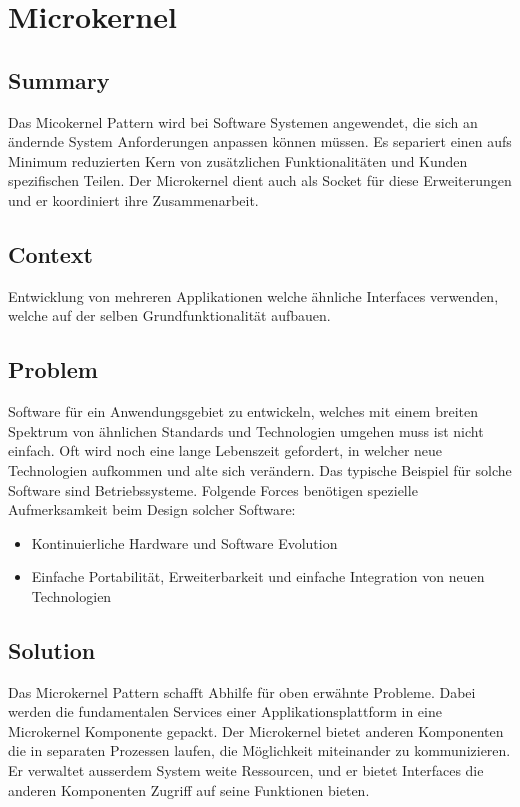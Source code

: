 \chapter{Microkernel}

\section{Summary}
Das Micokernel Pattern wird bei Software Systemen angewendet, die sich an ändernde System Anforderungen anpassen können müssen. Es separiert einen aufs Minimum reduzierten Kern von zusätzlichen Funktionalitäten und Kunden spezifischen Teilen. Der Microkernel dient auch als Socket für diese Erweiterungen und er koordiniert ihre Zusammenarbeit.
\section{Context}
Entwicklung von mehreren Applikationen welche ähnliche Interfaces verwenden, welche auf der selben Grundfunktionalität aufbauen.
\section{Problem}
Software für ein Anwendungsgebiet zu entwickeln, welches mit einem breiten Spektrum von ähnlichen Standards und Technologien umgehen muss ist nicht einfach. Oft wird noch eine lange Lebenszeit gefordert, in welcher neue Technologien aufkommen und alte sich verändern. Das typische Beispiel für solche Software sind Betriebssysteme. Folgende Forces benötigen spezielle Aufmerksamkeit beim Design solcher Software:
\begin{itemize}
	\item Kontinuierliche Hardware und Software Evolution
	\item Einfache Portabilität, Erweiterbarkeit und einfache Integration von neuen Technologien
\end{itemize}

\section{Solution}
Das Microkernel Pattern schafft Abhilfe für oben erwähnte Probleme. Dabei werden die fundamentalen Services einer Applikationsplattform in eine Microkernel Komponente gepackt. Der Microkernel bietet anderen Komponenten die in separaten Prozessen laufen, die Möglichkeit miteinander zu kommunizieren. Er verwaltet ausserdem System weite Ressourcen, und er bietet Interfaces die anderen Komponenten Zugriff auf seine Funktionen bieten.
